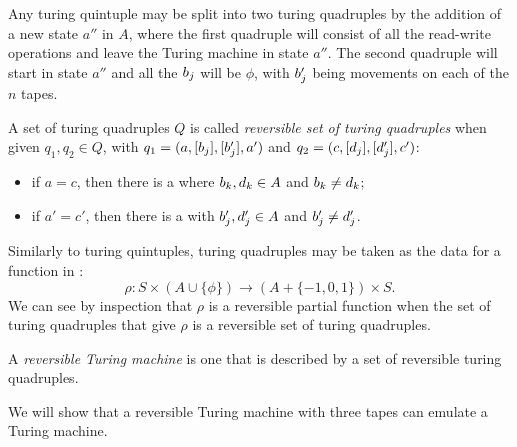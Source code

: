 \begin{remark}\label{rem:quintuple_to_quadruple}
  Any turing quintuple may be split into two
  turing quadruples by the addition of a new state $a''$ in $A$, where the
  first quadruple will consist of all the read-write operations and
  leave the Turing machine in state $a''$. The second quadruple will start
  in state $a''$ and all the $b_j$ will be $\phi$, with $b'_j$ being
  movements on each of the $n$ tapes.
\end{remark}

\begin{definition}\label{def:reversible_turing_quadruple}
  A set of turing quadruples $Q$ is called \emph{reversible set of turing
  quadruples} when given $q_1,q_2\in Q$, with $q_1=(a,[b_j], [b'_j], a')$ and
  $q_2=(c,[d_j], [d'_j], c')$:
\begin{itemize}
  \item  if $a=c$, then there is a \kay where $b_k, d_k \in A$ and
    $b_k \ne d_k$;
  \item if $a' = c'$, then there is a \jay with $b'_j, d'_j \in A$ and
    $b'_j \ne d'_j$.
\end{itemize}
\end{definition}

Similarly to turing quintuples, turing quadruples may be taken as the
data for a function in \sets:
\[\rho:S\times(A  \cup \{\phi\}) \to (A  + \{-1,0,1\}) \times S.\]
We can see by inspection that $\rho$ is a reversible partial function when
the set of turing quadruples that give $\rho$ is a reversible set of turing
quadruples.

\begin{definition}\label{def:reversible_turing_machine}
  A \emph{reversible Turing machine} is one that is described by a
  set of reversible turing quadruples.
\end{definition}

We will show that a reversible Turing machine with three tapes can emulate
a Turing machine.

